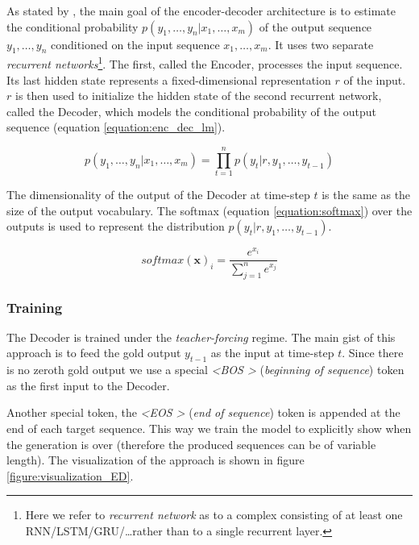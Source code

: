 As stated by \citet{sutskever2014sequence}, the main goal of the encoder-decoder architecture is to estimate the conditional probability $p(y_1,\dots,y_n | x_1,\dots,x_m)$ of the output sequence $y_1,\dots,y_n$ conditioned on the input sequence $x_1,\dots,x_m$. It uses two separate \emph{recurrent networks}\footnote{Here we refer to \emph{recurrent network} as to a complex consisting of at least one RNN/LSTM/GRU/\dots rather than to a single recurrent layer.}. The first, called the Encoder, processes the input sequence. Its last hidden state represents a fixed-dimensional representation $r$ of the input. $r$ is then used to initialize the hidden state of the second recurrent network, called the Decoder, which models the conditional probability of the output sequence (equation \ref{equation:enc_dec_lm}).

\begin{equation} \label{equation:enc_dec_lm}
    p(y_1,\dots, y_n | x_1,\dots, x_m) = \prod_{t=1}^n{p(y_t | r, y_1, \dots, y_{t-1})}
\end{equation}

The dimensionality of the output of the Decoder at time-step $t$ is the same as the size of the output vocabulary. The softmax (equation \ref{equation:softmax}) over the outputs is used to represent the distribution $p(y_t | r, y_1, \dots, y_{t-1})$.

\begin{equation} \label{equation:softmax}
    softmax(\boldsymbol{x})_i = \frac{e^{x_i}}{\sum_{j=1}^n{e^{x_j}}}
\end{equation}

\subsubsection{Training}

The Decoder is trained under the \emph{teacher-forcing} regime. The main gist of this approach is to feed the gold output $y_{t-1}$ as the input at time-step $t$. Since there is no zeroth gold output we use a special \emph{\textless BOS \textgreater} (\emph{beginning of sequence}) token as the first input to the Decoder.

Another special token, the \emph{\textless EOS \textgreater} (\emph{end of sequence}) token is appended at the end of each target sequence. This way we train the model to explicitly show when the generation is over (therefore the produced sequences can be of variable length). The visualization of the approach is shown in figure \ref{figure:visualization_ED}.

